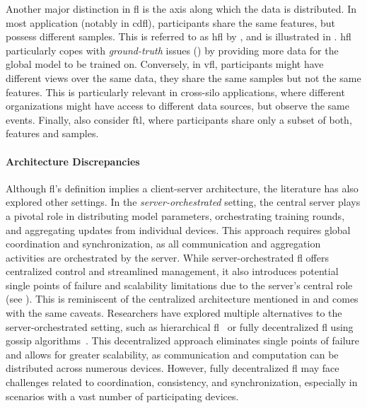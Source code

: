 Another major distinction in \gls{fl} is the axis along which the data is distributed.
In most application (notably in \gls{cdfl}), participants share the same features, but possess different samples.
This is referred to as \gls{hfl} by \textcite{yang_FederatedMachineLearning_2019}, and is illustrated in .
\Gls{hfl} particularly copes with \emph{ground-truth} issues () by providing more data for the global model to be trained on.
Conversely, in \gls{vfl}, participants might have different views over the same data, \ie they share the same samples but not the same features.
This is particularly relevant in cross-silo applications, where different organizations might have access to different data sources, but observe the same events.
Finally, \textcite{yang_FederatedMachineLearning_2019} also consider \gls{ftl}, where participants share only a subset of both, features and samples.


\paragraph{Architecture Discrepancies}

Although \gls{fl}'s definition implies a client-server architecture, the literature has also explored other settings.
In the \emph{server-orchestrated} setting, the central server plays a pivotal role in distributing model parameters, orchestrating training rounds, and aggregating updates from individual devices.
This approach requires global coordination and synchronization, as all communication and aggregation activities are orchestrated by the server.
While server-orchestrated \gls{fl} offers centralized control and streamlined management, it also introduces potential single points of failure and scalability limitations due to the server's central role (see ).
This is reminiscent of the centralized architecture mentioned in  and comes with the same caveats.
Researchers have explored multiple alternatives to the server-orchestrated setting, such as hierarchical \gls{fl}~\cite{liu_ClientEdgeCloudHierarchicalFederated_2020} or fully decentralized \gls{fl} using gossip algorithms~\cite{tang_GossipFLDecentralizedFederated_2023}.
This decentralized approach eliminates single points of failure and allows for greater scalability, as communication and computation can be distributed across numerous devices.
However, fully decentralized \gls{fl} may face challenges related to coordination, consistency, and synchronization, especially in scenarios with a vast number of participating devices.


